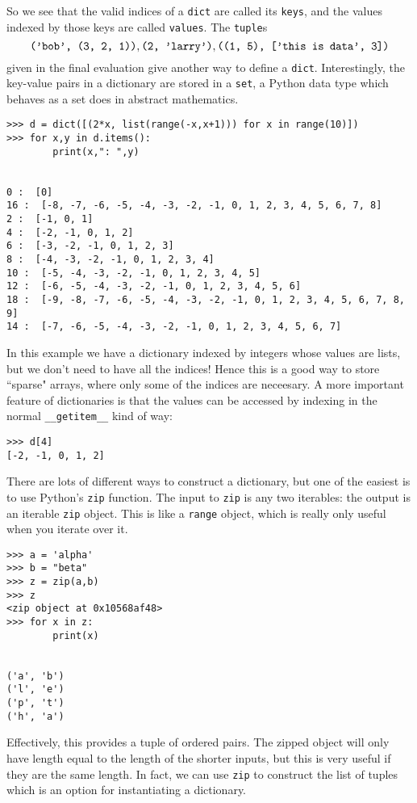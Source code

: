 \documentclass[m3380-lec-main.tex]{subfiles}
\begin{document}
\sloppypar So we see that the valid indices of a \verb|dict| are called its \verb|keys|, and the values indexed by those keys are called \verb|values|. The \verb|tuple|s 
\[\verb|('bob', (3, 2, 1))|, \verb|(2, 'larry')|, \verb|((1, 5), ['this is data', 3])|\] given in the final evaluation give another way to define a \verb|dict|. Interestingly, the key-value pairs in a dictionary are stored in a \verb|set|, a Python data type which behaves as a set does in abstract mathematics.


\bc\begin{verbatim}
>>> d = dict([(2*x, list(range(-x,x+1))) for x in range(10)])
>>> for x,y in d.items():
        print(x,": ",y)

	
0 :  [0]
16 :  [-8, -7, -6, -5, -4, -3, -2, -1, 0, 1, 2, 3, 4, 5, 6, 7, 8]
2 :  [-1, 0, 1]
4 :  [-2, -1, 0, 1, 2]
6 :  [-3, -2, -1, 0, 1, 2, 3]
8 :  [-4, -3, -2, -1, 0, 1, 2, 3, 4]
10 :  [-5, -4, -3, -2, -1, 0, 1, 2, 3, 4, 5]
12 :  [-6, -5, -4, -3, -2, -1, 0, 1, 2, 3, 4, 5, 6]
18 :  [-9, -8, -7, -6, -5, -4, -3, -2, -1, 0, 1, 2, 3, 4, 5, 6, 7, 8, 9]
14 :  [-7, -6, -5, -4, -3, -2, -1, 0, 1, 2, 3, 4, 5, 6, 7]
\end{verbatim}
\ec
In this example we have a dictionary indexed by integers whose values are lists, but we don't need to have all the indices! Hence this is a good way to store ``sparse" arrays, where only some of the indices are neceesary. A more important feature of dictionaries is that the values can be accessed by indexing in the normal \verb|__getitem__| kind of way:

\bc\begin{verbatim}
>>> d[4]
[-2, -1, 0, 1, 2]
\end{verbatim}
\ec
There are lots of different ways to construct a dictionary, but one of the easiest is to use Python's \verb|zip| function. The input to \verb|zip| is any two iterables: the output is an iterable \verb|zip| object. This is like a \verb|range| object, which is really only useful when you iterate over it.

\bc\begin{verbatim}
>>> a = 'alpha'
>>> b = "beta"
>>> z = zip(a,b)
>>> z
<zip object at 0x10568af48>
>>> for x in z:
        print(x)

	
('a', 'b')
('l', 'e')
('p', 't')
('h', 'a')
\end{verbatim}
\ec
Effectively, this provides a tuple of ordered pairs. The zipped object will only have length equal to the length of the shorter inputs, but this is very useful if they are the same length. In fact, we can use \verb|zip| to construct the list of tuples which is an option for instantiating a dictionary.
\end{document}

